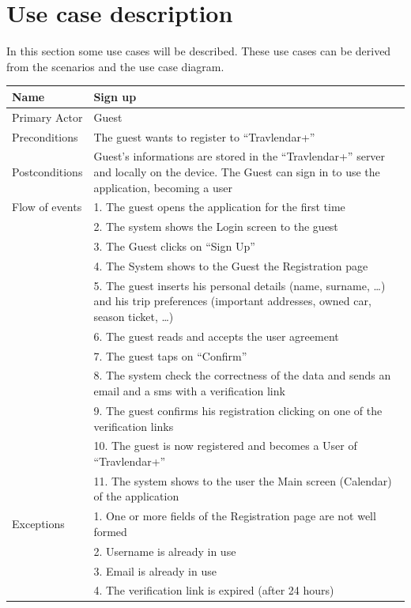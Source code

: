 \section{Use case description}
In this section some use cases will be described. These use cases can be
derived from the scenarios and the use case diagram.
%
\begin{center}
\def\arraystretch{1.2}
  \begin{tabular}{ | l | p{} | }
    \hline
    Name & Sign up \\ \hline
    Primary Actor & Guest \\ \hline
    Preconditions & The guest wants to register to “Travlendar+” \\ \hline
    Postconditions & Guest's informations are stored in the “Travlendar+” server and locally on the device. The Guest can sign in to use the application, becoming a user \\ \hline
    Flow of events  & 1.	The guest opens the application for the first time \\
					& 2.	The system shows the Login screen to the guest \\
					& 3.	The Guest clicks on “Sign Up” \\
					& 4.	The System shows to the Guest the Registration page \\
					& 5.	The guest inserts his personal details (name, surname, …) and his trip preferences (important addresses, owned car, season ticket, …) \\
					& 6.	The guest reads and accepts the user agreement \\
					& 7.	The guest taps on “Confirm” \\
					& 8.	The system check the correctness of the data and sends an email and a sms with a verification link \\
					& 9.	The guest confirms his registration clicking on one of the verification links \\
					& 10.	The guest is now registered and becomes a User of “Travlendar+” \\
					& 11.	The system shows to the user the Main screen (Calendar) of the application \\ \hline    
    Exceptions  & 1.	One or more fields of the Registration page are not well formed \\
				& 2.	Username is already in use \\
				& 3.	Email is already in use \\
				& 4.	The verification link is expired (after 24 hours)\\ \hline
  \end{tabular}
\end{center}

